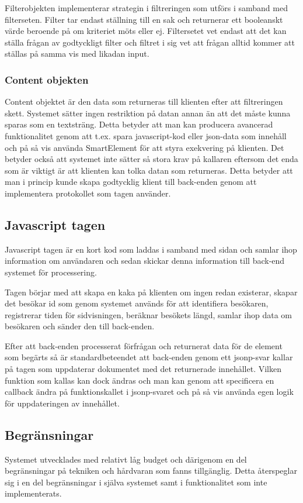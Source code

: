 Filterobjekten implementerar strategin i filtreringen som utförs i samband med filterseten. Filter tar endast ställning till en sak och returnerar ett booleanskt värde beroende på om kriteriet möts eller ej. Filtersetet vet endast att det kan ställa frågan av godtyckligt filter och filtret i sig vet att frågan alltid kommer att ställas på samma vis med likadan input.

\subsubsection{Content objekten}



Content objektet är den data som returneras till klienten efter att filtreringen skett. Systemet sätter ingen restriktion på datan annan än att det måste kunna sparas som en textsträng. Detta betyder att man kan producera avancerad funktionalitet genom att t.ex. spara javascript-kod eller \gls{json}-data som innehåll och på så vis använda SmartElement för att styra exekvering på klienten. Det betyder också att systemet inte sätter så stora krav på kallaren eftersom det enda som är viktigt är att klienten kan tolka datan som returneras. Detta betyder att man i princip kunde skapa godtycklig klient till back-enden genom att implementera protokollet som tagen använder.

\subsection{Javascript tagen}

Javascript tagen är en kort kod som laddas i samband med sidan och samlar ihop information om användaren och sedan skickar denna information till back-end systemet för processering.

Tagen börjar med att skapa en kaka på klienten om ingen redan existerar, skapar det besökar id som genom systemet används för att identifiera besökaren, registrerar tiden för sidvisningen, beräknar besökets längd, samlar ihop data om besökaren och sänder den till back-enden.

Efter att back-enden processerat förfrågan och returnerat data för de element som begärts så är standardbeteendet att back-enden genom ett \gls{jsonp}-svar kallar på tagen som uppdaterar dokumentet med det returnerade innehållet. Vilken funktion som kallas kan dock ändras och man kan genom att specificera en callback ändra på funktionskallet i \gls{jsonp}-svaret och på så vis använda egen logik för uppdateringen av innehållet.

\subsection{Begränsningar}

Systemet utvecklades med relativt låg budget och därigenom en del begränsningar på tekniken och hårdvaran som fanns tillgänglig. Detta återspeglar sig i en del begränsningar i själva systemet samt i funktionalitet som inte implementerats.


